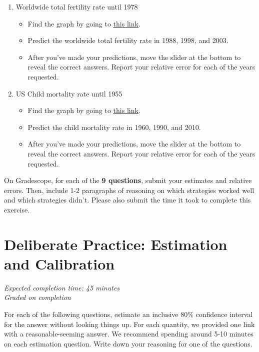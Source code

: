 \documentclass[11pt]{article}
\begin{document}
\begin{enumerate}
\begin{itemize}
	\end{itemize}
        
	\item Worldwide total fertility rate until 1978
	\begin{itemize}
		\item Find the graph by going to       \href{https://ourworldindata.org/grapher/children-per-woman-un?tab=chart&time=1950..1978}{this link}.
		\item Predict the worldwide total fertility rate in 1988, 1998, and 2003.
              \item After you've made your predictions, move the slider at the bottom to reveal the correct answers. Report your relative error for each of the years requested.
	\end{itemize}
	
	\item US Child mortality rate until 1955
	\begin{itemize}
		\item Find the graph by going to       \href{https://ourworldindata.org/grapher/child-mortality?time=earliest..1955&country=~USA}{this link}.
		\item Predict the child mortality rate in 1960, 1990, and 2010.
          \item After you've made your predictions, move the slider at the bottom to reveal the correct answers. Report your relative error for each of the years requested.
	\end{itemize}
\end{enumerate}

On Gradescope, for each of the \textbf{9 questions}, submit your estimates and relative errors. Then, include 1-2 paragraphs of reasoning on which strategies worked well and which strategies didn't. Please also submit the time it took to complete this exercise.

\section*{Deliberate Practice: Estimation and Calibration}

\emph{Expected completion time: 45 minutes} \\
\emph{Graded on  completion}

For each of the following questions, estimate an inclusive $80\%$ confidence interval for the answer without looking things up. For each quantity, we provided one link with a reasonable-seeming answer. We recommend spending around 5-10 minutes on each estimation question. Write down your reasoning for one of the questions. 
\end{document}
